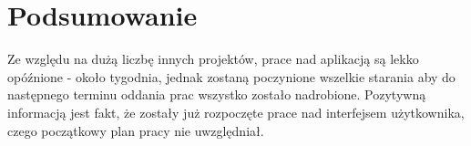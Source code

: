 \documentclass[a4paper]{article}
\begin{document}
\section{Podsumowanie}
Ze względu na dużą liczbę innych projektów, prace nad aplikacją są lekko opóźnione - około tygodnia, jednak zostaną poczynione wszelkie starania aby do następnego terminu oddania prac wszystko zostało nadrobione. 
Pozytywną informacją jest fakt, że zostały już rozpoczęte prace nad interfejsem użytkownika, czego początkowy plan pracy nie uwzględniał.
\end{document}
